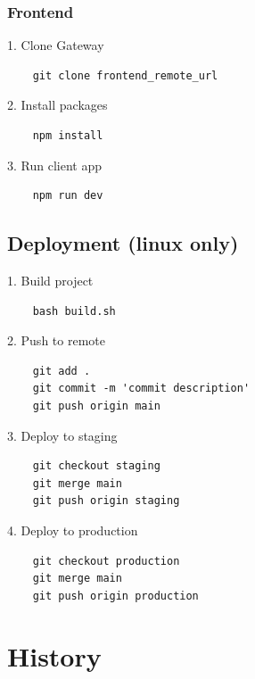 \documentclass{report}
\begin{document}
\subsubsection{Frontend}
1. Clone Gateway
\begin{lstlisting}
	git clone frontend_remote_url
\end{lstlisting}
2. Install packages
\begin{lstlisting}
	npm install
\end{lstlisting}
3. Run client app
\begin{lstlisting}
	npm run dev
\end{lstlisting}
\subsection{Deployment (linux only)}
1. Build project
\begin{lstlisting}
	bash build.sh
\end{lstlisting}
2. Push to remote
\begin{lstlisting}
	git add .
	git commit -m 'commit description'
	git push origin main
\end{lstlisting}
3. Deploy to staging
\begin{lstlisting}
	git checkout staging
	git merge main
	git push origin staging
\end{lstlisting}
4. Deploy to production
\begin{lstlisting}
	git checkout production
	git merge main
	git push origin production
\end{lstlisting}
\section{History}
\end{document}
